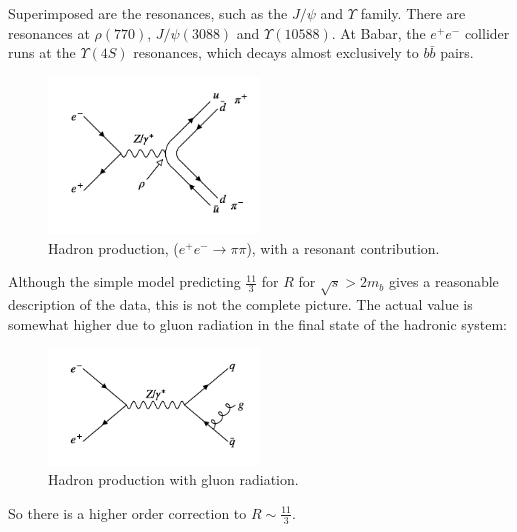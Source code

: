 Superimposed are the resonances, such as the $J/\psi$ and $\Upsilon$ family.  There are resonances at $\rho(770)$, $J/\psi(3088)$ and $\Upsilon(10588)$.  At Babar, the $e^+e^-$ collider runs at the $\Upsilon(4S)$ resonances, which decays almost exclusively to $b\bar{b}$ pairs.

\begin{figure}[!htb]
  \begin{center}
    \includegraphics[width=0.5\textwidth]{images/web_feynman/image_31.png}
    \caption[Hadron production ($e^+e^-\to\pi\pi$)]{Hadron production, ($e^+e^-\to\pi\pi$), with a resonant contribution.}
    \label{fig:ch8_EpEmToPiPi}
  \end{center}
\end{figure}

Although the simple model predicting $\frac{11}{3}$ for $R$ for $\sqrt{s}>2m_b$ gives a reasonable description of the data, this is not the complete picture.  The actual value is somewhat higher due to gluon radiation in the final state of the hadronic system:

\begin{figure}[!htb]
  \begin{center}
    \includegraphics[width=0.5\textwidth]{images/web_feynman/image_32.png}
    \caption[Hadron production with gluon radiation]{Hadron production with gluon radiation.}
    \label{fig:ch8_EpEmToQQG}
  \end{center}
\end{figure}

So there is a higher order correction to $R\sim\frac{11}{3}$.

